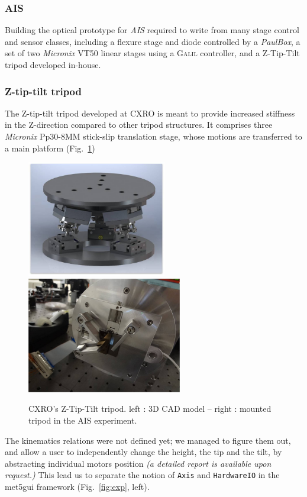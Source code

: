 \documentclass[10pt,letter,twoside]{report}
\begin{document}
\subsubsection{AIS}
Building the optical prototype for \emph{AIS} required to write from many stage control and sensor classes, including a flexure stage and diode controlled by a \textit{PaulBox}, a set of two \textit{Micronix} VT50 linear stages using a \textsc{Galil} controller, and a Z-Tip-Tilt tripod developed in-house.
\subsubsection{Z-tip-tilt tripod}
The Z-tip-tilt tripod developed at CXRO is meant to provide increased stiffness in the Z-direction compared to other tripod structures.
It comprises three \textit{Micronix} Pp30-8MM stick-slip translation stage, whose motions are transferred to a main platform (Fig.~\ref{fig:tripod})
\begin{figure}[ht]
	\centerline{\includegraphics[height=2in]{img/tripod_3d.jpg}
	\includegraphics[height=2in]{img/tripod_mounted.jpg}}
	\caption{CXRO's Z-Tip-Tilt tripod. 	left : 3D CAD model -- right : mounted tripod in the AIS experiment.}
	\label{fig:tripod}
\end{figure}
The kinematics relations were not defined yet; we managed to figure them out, and allow a user to independently change the height, the tip and the tilt, by abstracting individual motors position \textit{(a detailed report is available upon request.)}
This lead us to separate the notion of \verb!Axis! and \verb!HardwareIO! in the met5gui framework (Fig.~\ref{fig:exp}, left). 
\end{document}
